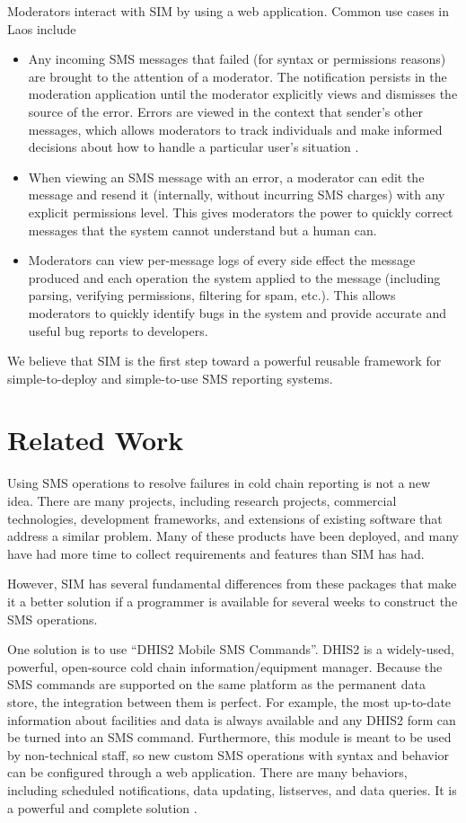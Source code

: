 \documentclass{acm_proc_article-sp}
\begin{document}
Moderators interact with SIM by using a web application. Common use cases in Laos include

\begin{itemize}
\item Any incoming SMS messages that failed (for syntax or permissions reasons) are brought to the attention of a moderator. The notification persists in the moderation application until the moderator explicitly views and dismisses the source of the error. Errors are viewed in the context that sender's other messages, which allows moderators to track individuals and make informed decisions about how to handle a particular user's situation
.\item When viewing an SMS message with an error, a moderator can edit the message and resend it (internally, without incurring SMS charges) with any explicit permissions level. This gives moderators the power to quickly correct messages that the system cannot understand but a human can.
\item Moderators can view per-message logs of every side effect the message produced and each operation the system applied to the message (including parsing, verifying permissions, filtering for spam, etc.). This allows moderators to quickly identify bugs in the system and provide accurate and useful bug reports to developers.
\end{itemize}

We believe that SIM is the first step toward a powerful reusable framework for simple-to-deploy and simple-to-use SMS reporting systems.

\section{Related Work}

Using SMS operations to resolve failures in cold chain reporting is not a new idea. There are many projects, including research projects, commercial technologies, development frameworks, and extensions of existing software that address a similar problem. Many of these products have been deployed, and many have had more time to collect requirements and features than SIM has had.

However, SIM has several fundamental differences from these packages that make it a better solution if a programmer is available for several weeks to construct the SMS operations.

One solution is to use ``DHIS2 Mobile SMS Commands''. DHIS2 is a widely-used, powerful, open-source cold chain information/equipment manager. Because the SMS commands are supported on the same platform as the permanent data store, the integration between them is perfect. For example, the most up-to-date information about facilities and data is always available and any DHIS2 form can be turned into an SMS command. Furthermore, this module is meant to be used by non-technical staff, so new custom SMS operations with syntax and behavior can be configured through a web application. There are many behaviors, including scheduled notifications, data updating, listserves, and data queries. It is a powerful and complete solution \cite{dhis2:smsref, dhis2:smsoverview}.
\end{document}
